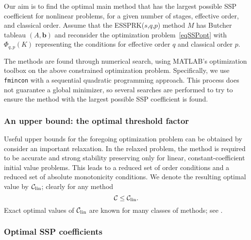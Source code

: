 \qquad Our aim is to find the optimal main method that has the largest possible
SSP coefficient for nonlinear problems, for a given number of stages, effective order,
and classical order. 
Assume that the ESSPRK(\( s \),\( q \),\( p \)) method \( M \) has Butcher tableau  \( (A, \bm{b}) \)
and reconsider the optimization problem~\eqref{eqSSPopt}
with \( \Phi_{q,p}(K) \) representing  the conditions for effective order $q$ and classical order $p$.

The methods are found through numerical search, using
\textsc{MATLAB}'s optimization toolbox on the above constrained
optimization problem.  Specifically, we use \verb"fmincon" with a
sequential quadratic programming approach.
This process does not guarantee a global minimizer, so several
searches are performed to try to ensure the method with the largest possible SSP coefficient is found.

\subsubsection{An upper bound: the optimal threshold factor}
Useful upper bounds for the foregoing optimization problem can be obtained
by consider an important relaxation.  In the relaxed problem, the method is
required to be accurate and strong stability preserving only for linear,
constant-coefficient initial value problems.  This leads to a reduced set of
order conditions and a reduced set of absolute monotonicity conditions.  We
denote the resulting optimal value by $\mathcal{C}_{\text{lin}}$; clearly for any method
$$\mathcal{C}\le\mathcal{C}_{\text{lin}}.$$
Exact optimal values of $\mathcal{C}_{\text{lin}}$ are known for many classes of methods; see
\cite{Kraaijevanger1986,ketcheson2009a}.



\subsubsection{Optimal SSP coefficients\label{subsection3.1.2}}

